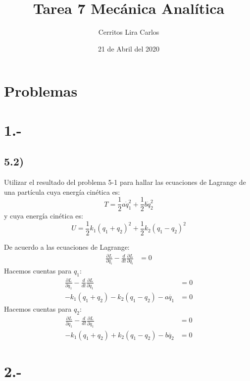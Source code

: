 \documentclass{article}
\title{Tarea 7 Mecánica Analítica}
\author{Cerritos Lira Carlos}
\date{21 de Abril del 2020}
\begin{document}
\maketitle
\section*{Problemas}
\section*{1.-}
\subsection*{5.2)}
Utilizar el resultado del problema 5-1 para hallar las ecuaciones de
Lagrange de una partícula cuya energía cinética es:
\[ T = \frac{1}{2}a\dot{q}_1^2+\frac{1}{2}b\dot{q}_2^2 \]
y cuya energía cinética es:
\[ U = \frac{1}{2}k_1(q_1+q_2)^2+\frac{1}{2}k_2(q_1-q_2)^2 \]
\begin{tcolorbox}[breakable]
    De acuerdo a las ecuaciones de Lagrange:
    \begin{align*}
        \frac{\partial L}{\partial q_i} - \frac{d}{dt}\frac{\partial L }{\partial \dot{q}_i} &= 0 
    \end{align*}
    Hacemos cuentas para $q_1$:
    \begin{align*}
        \frac{\partial L}{\partial q_1} - \frac{d}{dt}\frac{\partial L }{\partial \dot{q}_1} &= 0 \\
        -k_1(q_1+q_2) - k_2(q_1-q_2) - a\ddot{q_1} &= 0 
    \end{align*}
    Hacemos cuentas para $q_2$:
    \begin{align*}
        \frac{\partial L}{\partial q_1} - \frac{d}{dt}\frac{\partial L }{\partial \dot{q}_1} &= 0 \\
        -k_1(q_1+q_2) + k_2(q_1-q_2) - b\ddot{q_2} &= 0  
    \end{align*}
\end{tcolorbox}

\section*{2.-}
\end{document}
